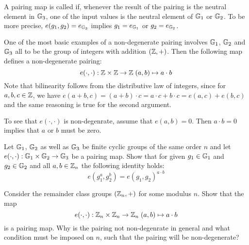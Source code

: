 A pairing map is called  if, whenever the result of the pairing is the neutral element in $\mathbb{G}_3$, one of the input values is the neutral element of $\mathbb{G}_1$ or $\mathbb{G}_2$. To be more precise, $e(g_1,g_2)=e_{\mathbb{G}_3}$ implies $g_1=e_{\mathbb{G}_1}$ or $g_2=e_{\mathbb{G}_2}$.
\begin{example}
\label{example:integer_addition_pairing}
One of the most basic examples of a non-degenerate pairing involves $\mathbb{G}_1$, $\mathbb{G}_2$ and $\mathbb{G}_3$ all to be the group of integers with addition $(\mathbb{Z},+)$. Then the following map defines a non-degenerate pairing:
$$
e(\cdot,\cdot): \mathbb{Z} \times \mathbb{Z} \to \mathbb{Z} \; (a,b)\mapsto a\cdot b
$$
Note that bilinearity follows from the distributive law of integers, since for $a,b,c\in \mathbb{Z}$, we have $e(a+b,c)=(a+b)\cdot c = a\cdot c + b\cdot c = e(a,c)+ e(b,c)$ and the same reasoning is true for the second argument.

To see that $e(\cdot,\cdot)$ is non-degenrate, assume that $e(a,b)=0$. Then $a\cdot b =0$ implies that $a$ or $b$ must be zero.
\end{example}
\begin{exercise} Let $\mathbb{G}_1$, $\mathbb{G}_2$ as well as $\mathbb{G}_3$ be finite cyclic groups of the same order $n$ and let $e(\cdot,\cdot): \mathbb{G}_1 \times \mathbb{G}_2 \to \mathbb{G}_3$ be a pairing map. Show that for given $g_1\in \mathbb{G}_1$ and $g_2\in \mathbb{G}_2$ and all $a,b\in \mathbb{Z}_n$ the following identity holds:
\begin{equation}
e(g_1^a, g_2^b) = e(g_1,g_2)^{a\cdot b}
\end{equation}
\end{exercise}
\begin{exercise} Consider the remainder class groups $(\mathbb{Z}_n,+)$ for some modulus $n$. Show that the map
$$
e(\cdot,\cdot): \mathbb{Z}_n \times \mathbb{Z}_n \to \mathbb{Z}_n \; (a,b)\mapsto a\cdot b
$$
is a pairing map. Why is the pairing not non-degenrate in general and what condition must be imposed on $n$, such that the pairing will be non-degenerate?
\end{exercise}

